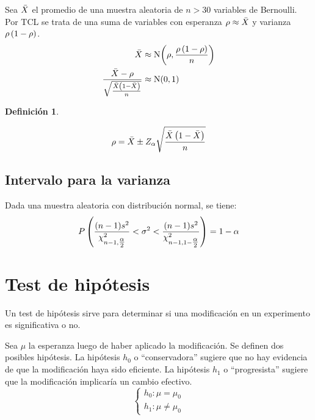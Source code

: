 \documentclass[a5paper,12pt,twoside]{book}
\newtheorem{defn}{{Definición}}[chapter]
\begin{document}
Sea $\ave{X}$ el promedio de una muestra aleatoria de $n>30$ variables de Bernoulli.
Por TCL se trata de una suma de variables con esperanza $\rho \approx \ave{X}$ y varianza $\rho \bb{1-\rho}$.
\begin{align*}
    \ave{X} & \approx \fx[\nor]{\rho , \frac{\rho \bb{1-\rho}}{n}}
    \\
    \frac{\ave{X}-\rho}{\sqrt{\frac{\ave{X} \bb{1-\ave{X}}}{n}}} & \approx \nor(0,1)
\end{align*}

\begin{mdframed}[style=MyFrame1]
    \begin{defn}
    \end{defn}
    \begin{equation*}
        \rho = \ave{X} \pm Z_\alpha \sqrt{\frac{\ave{X} \bb{1-\ave{X}}}{n}}
    \end{equation*}
\end{mdframed}


\subsection{Intervalo para la varianza}

Dada una muestra aleatoria con distribución normal, se tiene:
\begin{equation*}
    P \bb{\frac{(n-1)s^2}{\chi_{n-1,\tfrac{\alpha}{2}}^2} < \sigma^2 < \frac{(n-1)s^2}{\chi_{n-1,1-\tfrac{\alpha}{2}}^2} } = 1 - \alpha
\end{equation*}


\section{Test de hipótesis}

Un test de hipótesis sirve para determinar si una modificación en un experimento es significativa o no.

Sea $\mu$ la esperanza luego de haber aplicado la modificación. Se definen dos posibles hipótesis. La hipótesis $h_0$ o ``conservadora'' sugiere que no hay evidencia de que la modificación haya sido eficiente. La hipótesis $h_1$ o ``progresista'' sugiere que la modificación implicaría un cambio efectivo.
\begin{equation*}
    \left\{
    \begin{aligned}
        h_0: \mu = \mu_0
        \\
        h_1: \mu \neq \mu_0
    \end{aligned}
    \right.
\end{equation*}
\end{document}
